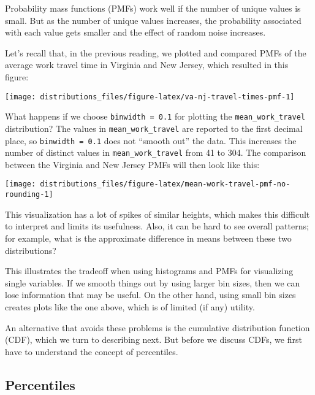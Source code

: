 \documentclass[
]{book}
\begin{document}
Probability mass functions (PMFs) work well if the number of unique values is small.
But as the number of unique values increases, the probability associated with each value gets smaller and the effect of random noise increases.

Let's recall that, in the previous reading, we plotted and compared PMFs of the average work travel time in Virginia and New Jersey, which resulted in this figure:

\begin{center}\texttt{[image: distributions\_files/figure-latex/va-nj-travel-times-pmf-1]} \end{center}

What happens if we choose \texttt{binwidth\ =\ 0.1} for plotting the \texttt{mean\_work\_travel} distribution?
The values in \texttt{mean\_work\_travel} are reported to the first decimal place, so \texttt{binwidth\ =\ 0.1} does not ``smooth out'' the data.
This increases the number of distinct values in \texttt{mean\_work\_travel} from 41 to 304.
The comparison between the Virginia and New Jersey PMFs will then look like this:

\begin{center}\texttt{[image: distributions\_files/figure-latex/mean-work-travel-pmf-no-rounding-1]} \end{center}

This visualization has a lot of spikes of similar heights, which makes this difficult to interpret and limits its usefulness.
Also, it can be hard to see overall patterns; for example, what is the approximate difference in means between these two distributions?

This illustrates the tradeoff when using histograms and PMFs for visualizing single variables.
If we smooth things out by using larger bin sizes, then we can lose information that may be useful.
On the other hand, using small bin sizes creates plots like the one above, which is of limited (if any) utility.

An alternative that avoids these problems is the cumulative distribution function (CDF), which we turn to describing next.
But before we discuss CDFs, we first have to understand the concept of percentiles.

\hypertarget{percentiles}{%
\subsection{Percentiles}\label{percentiles}}
\end{document}
